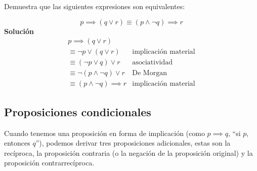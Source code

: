 \begin{fmd-example}
	Demuestra que las siguientes expresiones son equivalentes:
	
	\[
	p \implies \left( q \lor r \right) \equiv \left( p \land \neg q \right) \implies r
	\]
	\textbf{Solución}
	\[ \begin{array}{ll}
	p \implies \left( q \lor r \right) & \\
		\equiv \neg p \lor \left(q \lor r\right) & \mbox{implicación material}\\
		\equiv \left(\neg p \lor q \right) \lor r& \mbox{asociatividad}\\
		\equiv \neg \left(p \land \neg q\right) \lor r & \mbox{De Morgan}\\
		\equiv \left(p \land \neg q\right) \implies r & \mbox{implicación material}
	\end{array} \]
\end{fmd-example}

\subsection{Proposiciones condicionales}
Cuando tenemos una proposición en forma de implicación (como $p \implies q$,  ``si $p$, entonces $q$''), podemos derivar tres proposiciones adicionales, estas son la recíproca, la proposición contraria (o la negación de la proposición original) y la proposición contrarrecíproca.

